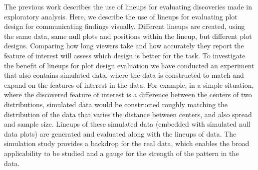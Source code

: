 The previous work \cite{buja:2009,wickham:2010} describes the use of lineups for evaluating discoveries made in exploratory analysis. Here, we describe the use of lineups for evaluating plot design for communicating findings visually. Different lineups are created, using the same data, same null plots and positions within the lineup, but different plot designs. Comparing how long viewers take and how accurately they report the feature of interest will assess which design is better for the task. To investigate the benefit of lineups for plot design evaluation we have conducted an experiment that also contains simulated data, where the data is constructed to match and expand on the features of interest in the data. For example, in a simple situation, where the discovered feature of interest is a difference between the centers of two distributions, simulated data would be constructed roughly matching the distribution of the data that varies the distance between centers, and also spread and sample size. Lineups of these simulated data (embedded with simulated null data plots) are generated and evaluated along with the lineups of data. The simulation study provides a backdrop for the real data, which enables the broad applicability to be studied and a gauge for the strength of the pattern in the data.




